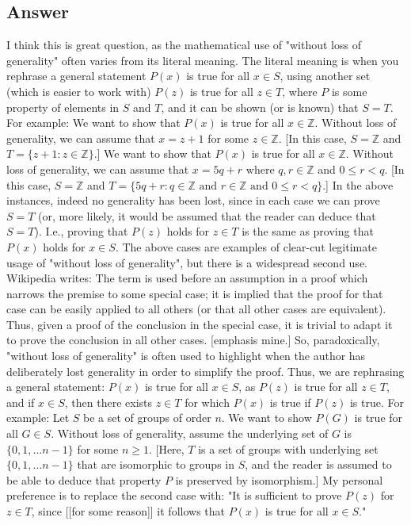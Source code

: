 \documentclass{article}
\begin{document}
\subsection*{Answer}
I think this is great question, as the mathematical use of "without loss of generality" often varies from its literal meaning. The literal meaning is when you rephrase a general statement $P(x)$ is true for all $x \in S$, using another set (which is easier to work with) $P(z)$ is true for all $z \in T$, where $P$ is some property of elements in $S$ and $T$, and it can be shown (or is known) that $S=T$. For example: We want to show that $P(x)$ is true for all $x \in \mathbb{Z}$. Without loss of generality, we can assume that $x=z+1$ for some $z \in \mathbb{Z}$. [In this case, $S=\mathbb{Z}$ and $T=\{z+1:z \in \mathbb{Z}\}$.] We want to show that $P(x)$ is true for all $x \in \mathbb{Z}$. Without loss of generality, we can assume that $x=5q+r$ where $q,r \in \mathbb{Z}$ and $0 \leq r < q$. [In this case, $S=\mathbb{Z}$ and $T=\{5q+r:q \in \mathbb{Z} \text{ and } r \in \mathbb{Z} \text{ and } 0 \leq r < q\}$.] In the above instances, indeed no generality has been lost, since in each case we can prove $S=T$ (or, more likely, it would be assumed that the reader can deduce that $S=T$). I.e., proving that $P(z)$ holds for $z \in T$ is the same as proving that $P(x)$ holds for $x \in S$. The above cases are examples of clear-cut legitimate usage of "without loss of generality", but there is a widespread second use. Wikipedia writes: The term is used before an assumption in a proof which narrows the premise to some special case; it is implied that the proof for that case can be easily applied to all others (or that all other cases are equivalent). Thus, given a proof of the conclusion in the special case, it is trivial to adapt it to prove the conclusion in all other cases. [emphasis mine.] So, paradoxically, "without loss of generality" is often used to highlight when the author has deliberately lost generality in order to simplify the proof. Thus, we are rephrasing a general statement: $P(x)$ is true for all $x \in S$, as $P(z)$ is true for all $z \in T$, and if $x \in S$, then there exists $z \in T$ for which $P(x)$ is true if $P(z)$ is true. For example: Let $S$ be a set of groups of order $n$. We want to show $P(G)$ is true for all $G \in S$. Without loss of generality, assume the underlying set of $G$ is $\{0,1,\ldots n-1\}$ for some $n \geq 1$. [Here, $T$ is a set of groups with underlying set $\{0,1,\ldots n-1\}$ that are isomorphic to groups in $S$, and the reader is assumed to be able to deduce that property $P$ is preserved by isomorphism.] My personal preference is to replace the second case with: "It is sufficient to prove $P(z)$ for $z \in T$, since [[for some reason]] it follows that $P(x)$ is true for all $x \in S$."
\end{document}
